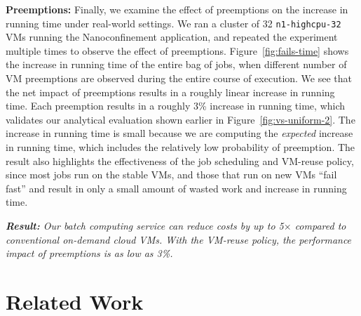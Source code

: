 \documentclass[sigconf]{acmart} %
\newcommand{\subsecspace}[0]{-0.20cm}
\begin{document}
\noindent \textbf{Preemptions:} 
Finally, we examine the effect of preemptions on the increase in running time under real-world settings.
We ran a cluster of 32 \texttt{n1-highcpu-32} VMs running the Nanoconfinement application, and repeated the experiment multiple times to observe the effect of preemptions.
Figure~\ref{fig:fails-time} shows the increase in running time of the entire bag of jobs, when different number of VM preemptions are observed during the entire course of execution.
We see that the net impact of preemptions results in a roughly linear increase in running time. 
Each preemption results in a roughly 3\% increase in running time, which validates our analytical evaluation shown earlier in Figure~\ref{fig:vs-uniform-2}.
The increase in running time is small because we are computing the \emph{expected} increase in running time, which includes the relatively low probability of preemption. 
The result also highlights the effectiveness of the job scheduling and VM-reuse policy, since most jobs run on the stable VMs, and  those that run on new VMs ``fail fast'' and result in only a small amount of wasted work and increase in running time. 

\noindent \emph{\textbf{Result:} Our batch computing service can reduce costs by up to 5$\times$ compared to conventional on-demand cloud VMs. With the VM-reuse policy, the performance impact of preemptions is as low as 3\%.}

\vspace*{\subsecspace}
\section{Related Work}
\label{sec:related}
\end{document}
